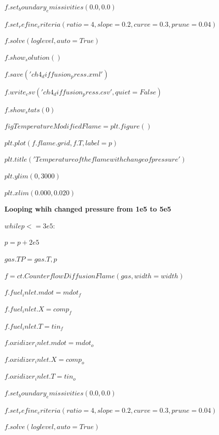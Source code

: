 \documentclass[a4paper]{article}
\begin{document}
$f.set_boundary_emissivities(0.0, 0.0)$

$f.set_refine_criteria(ratio=4, slope=0.2, curve=0.3, prune=0.04)$

$f.solve(loglevel, auto=True)$

$f.show_solution()$

$f.save('ch4_diffusion_press.xml')$

$f.write_csv('ch4_diffusion_press.csv', quiet=False)$

$f.show_stats(0)$

$figTemperatureModifiedFlame = plt.figure()$

$plt.plot(f.flame.grid, f.T, label=p )$

$plt.title('Temperature of the flame with change of pressure')$

$plt.ylim(0,3000)$

$plt.xlim(0.000, 0.020)$

\textbf{Looping whih changed pressure from 1e5 to 5e5}

$while p <= 3e5:$

\hspace{5,35mm}$    p=p+2e5$

\hspace{5,35mm}$    gas.TP = gas.T, p$

\hspace{5,35mm}$    f = ct.CounterflowDiffusionFlame(gas, width=width)$

\hspace{5,35mm}$    f.fuel_inlet.mdot = mdot_f$

\hspace{5,35mm}$    f.fuel_inlet.X = comp_f$

\hspace{5,35mm}$    f.fuel_inlet.T = tin_f$

\hspace{5,35mm}$    f.oxidizer_inlet.mdot = mdot_o$

\hspace{5,35mm}$    f.oxidizer_inlet.X = comp_o$

\hspace{5,35mm}$    f.oxidizer_inlet.T = tin_o$

\hspace{5,35mm}$    f.set_boundary_emissivities(0.0, 0.0)$

\hspace{5,35mm}$    f.set_refine_criteria(ratio=4, slope=0.2, curve=0.3, prune=0.04)$

\hspace{5,35mm}$    f.solve(loglevel, auto=True)$
\end{document}
